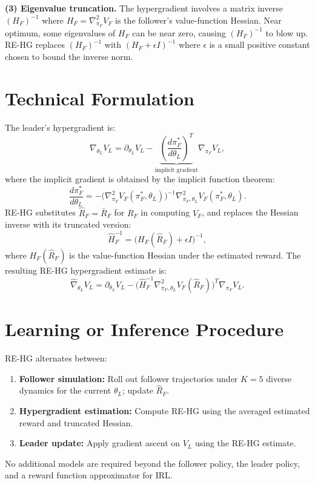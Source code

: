 \documentclass[10pt,twocolumn]{article}
\begin{document}
\textbf{(3) Eigenvalue truncation.} The hypergradient involves a matrix inverse
$(H_F)^{-1}$ where $H_F = \nabla^2_{\pi_F} V_F$ is the follower's value-function
Hessian. Near optimum, some eigenvalues of $H_F$ can be near zero, causing
$(H_F)^{-1}$ to blow up. RE-HG replaces $(H_F)^{-1}$ with $(H_F + \epsilon I)^{-1}$
where $\epsilon$ is a small positive constant chosen to bound the inverse norm.

\section{Technical Formulation}

The leader's hypergradient is:
\[
  \nabla_{\theta_L} V_L = \partial_{\theta_L} V_L
    - \underbrace{\left(\frac{d\pi_F^*}{d\theta_L}\right)^T}_{\text{implicit gradient}}
      \nabla_{\pi_F} V_L,
\]
where the implicit gradient is obtained by the implicit function theorem:
\[
  \frac{d\pi_F^*}{d\theta_L} = -\bigl(\nabla^2_{\pi_F} V_F(\pi_F^*,\theta_L)\bigr)^{-1}
    \nabla_{\pi_F, \theta_L}^2 V_F(\pi_F^*, \theta_L).
\]
RE-HG substitutes $\hat{R}_F = \bar{R}_F$ for $R_F$ in computing $V_F$, and
replaces the Hessian inverse with its truncated version:
\[
  \hat{H}_F^{-1} = \bigl(H_F(\hat{R}_F) + \epsilon I\bigr)^{-1},
\]
where $H_F(\hat{R}_F)$ is the value-function Hessian under the estimated reward.
The resulting RE-HG hypergradient estimate is:
\[
  \widehat{\nabla}_{\theta_L} V_L = \partial_{\theta_L} V_L
    - \bigl(\hat{H}_F^{-1} \nabla^2_{\pi_F,\theta_L} V_F(\hat{R}_F)\bigr)^T
      \nabla_{\pi_F} V_L.
\]

\section{Learning or Inference Procedure}

RE-HG alternates between:
\begin{enumerate}[itemsep=2pt,parsep=0pt]
  \item \textbf{Follower simulation:} Roll out follower trajectories under
    $K=5$ diverse dynamics for the current $\theta_L$; update $\hat{R}_F$.
  \item \textbf{Hypergradient estimation:} Compute RE-HG using the averaged
    estimated reward and truncated Hessian.
  \item \textbf{Leader update:} Apply gradient ascent on $V_L$ using the RE-HG
    estimate.
\end{enumerate}
No additional models are required beyond the follower policy, the leader policy,
and a reward function approximator for IRL.
\end{document}
